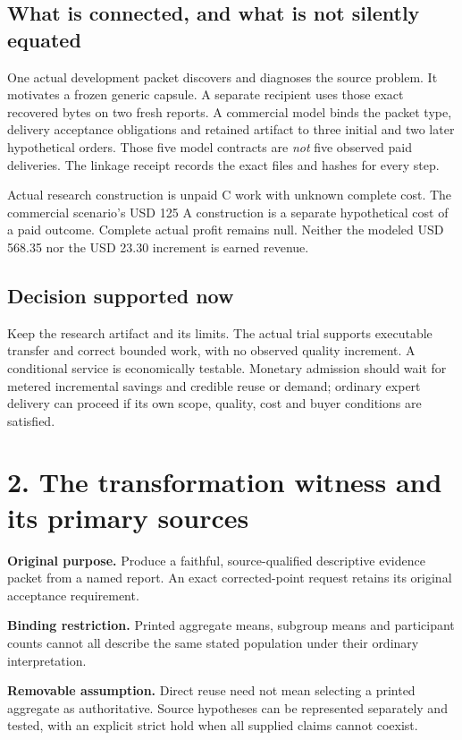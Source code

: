 \documentclass[10pt]{article}
\begin{document}
\subsection*{What is connected, and what is not silently equated}

One actual development packet discovers and diagnoses the source problem. It motivates a frozen generic capsule. A separate recipient uses those exact recovered bytes on two fresh reports. A commercial model binds the packet type, delivery acceptance obligations and retained artifact to three initial and two later hypothetical orders. Those five model contracts are \emph{not} five observed paid deliveries. The linkage receipt records the exact files and hashes for every step.

Actual research construction is unpaid C work with unknown complete cost. The commercial scenario's USD 125 A construction is a separate hypothetical cost of a paid outcome. Complete actual profit remains null. Neither the modeled USD 568.35 nor the USD 23.30 increment is earned revenue.

\subsection*{Decision supported now}

Keep the research artifact and its limits. The actual trial supports executable transfer and correct bounded work, with no observed quality increment. A conditional service is economically testable. Monetary admission should wait for metered incremental savings and credible reuse or demand; ordinary expert delivery can proceed if its own scope, quality, cost and buyer conditions are satisfied.

\clearpage
\section*{2. The transformation witness and its primary sources}

\textbf{Original purpose.} Produce a faithful, source-qualified descriptive evidence packet from a named report. An exact corrected-point request retains its original acceptance requirement.

\textbf{Binding restriction.} Printed aggregate means, subgroup means and participant counts cannot all describe the same stated population under their ordinary interpretation.

\textbf{Removable assumption.} Direct reuse need not mean selecting a printed aggregate as authoritative. Source hypotheses can be represented separately and tested, with an explicit strict hold when all supplied claims cannot coexist.
\end{document}
